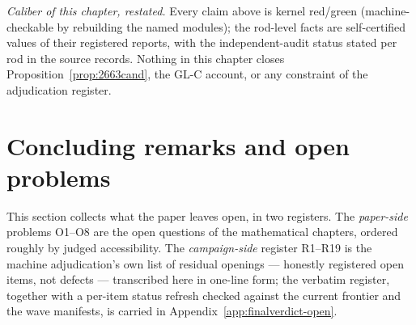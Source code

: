 \emph{Caliber of this chapter, restated.} Every claim above is kernel red/green
(machine-checkable by rebuilding the named modules); the rod-level facts are
self-certified values of their registered reports, with the independent-audit status
stated per rod in the source records. Nothing in this chapter closes
Proposition~\ref{prop:2663cand}, the GL-C account, or any constraint of the adjudication
register.
\section{Concluding remarks and open problems}\label{sec:open}

This section collects what the paper leaves open, in two registers. The
\emph{paper-side} problems O1--O8 are the open questions of the mathematical
chapters, ordered roughly by judged accessibility. The \emph{campaign-side}
register R1--R19 is the machine adjudication's own list of residual openings ---
honestly registered open items, not defects --- transcribed here in one-line
form; the verbatim register, together with a per-item status refresh checked
against the current frontier and the wave manifests, is carried in
Appendix~\ref{app:finalverdict-open}.

